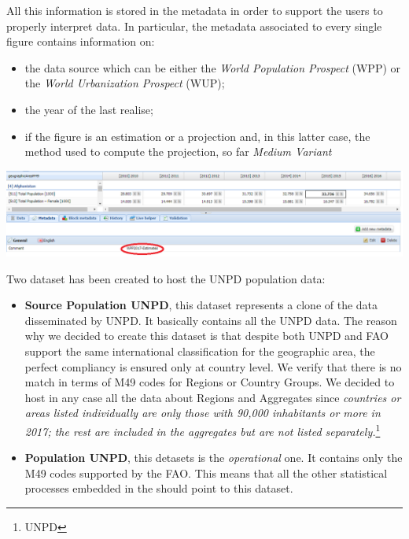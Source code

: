 \documentclass[nojss]{jss}\usepackage[]{graphicx}\usepackage[]{color}
\begin{document}
All this information is stored in the metadata in order to support the users to properly interpret data.
In particular, the metadata associated to every single figure contains information on:

\begin{itemize}
\item{the data source which can be either the \textit{World Population Prospect} (WPP) or the \textit{World Urbanization Prospect} (WUP); }
\item{the year of the last realise;}
\item{if the figure is an estimation or a projection and, in this latter case, the method used to compute the projection, so far \textit{Medium Variant}}
\end{itemize}



\begin{center}
\includegraphics{metadata.PNG}
\end{center}


Two dataset has been created to host the UNPD population data:
\begin{itemize}
\item{\textbf{Source Population UNPD}, this dataset represents a clone of the data disseminated by UNPD. It basically contains all the UNPD data. The reason why we decided to create this dataset is that despite both UNPD and FAO support the same international classification for the geographic area, the perfect compliancy is ensured only at country level. We verify that there is no match in terms of M49 codes for Regions or Country Groups. We decided to host in any case all the data about Regions and Aggregates since \textit{countries or areas listed individually are only those with 90,000 inhabitants or more in 2017; the rest are included in the aggregates but are not listed separately.}\footnote{UNPD}}
\item{\textbf{Population UNPD}, this detasets is the \textit{operational} one. It contains only the M49 codes supported by the FAO. This means that all the other statistical processes embedded in the  should point to this dataset.}
\end{itemize}
\end{document}
